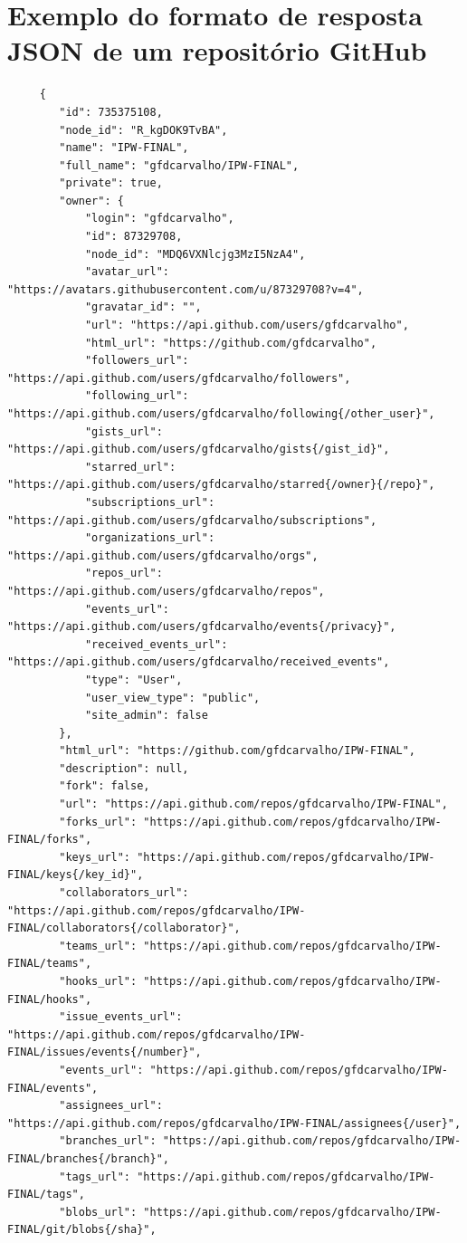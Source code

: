 %
%
\chapter{Exemplo do formato de resposta JSON de um repositório GitHub} \label{ap:repogithub}
\begin{lstlisting}
	 {
		"id": 735375108,
		"node_id": "R_kgDOK9TvBA",
		"name": "IPW-FINAL",
		"full_name": "gfdcarvalho/IPW-FINAL",
		"private": true,
		"owner": {
			"login": "gfdcarvalho",
			"id": 87329708,
			"node_id": "MDQ6VXNlcjg3MzI5NzA4",
			"avatar_url": "https://avatars.githubusercontent.com/u/87329708?v=4",
			"gravatar_id": "",
			"url": "https://api.github.com/users/gfdcarvalho",
			"html_url": "https://github.com/gfdcarvalho",
			"followers_url": "https://api.github.com/users/gfdcarvalho/followers",
			"following_url": "https://api.github.com/users/gfdcarvalho/following{/other_user}",
			"gists_url": "https://api.github.com/users/gfdcarvalho/gists{/gist_id}",
			"starred_url": "https://api.github.com/users/gfdcarvalho/starred{/owner}{/repo}",
			"subscriptions_url": "https://api.github.com/users/gfdcarvalho/subscriptions",
			"organizations_url": "https://api.github.com/users/gfdcarvalho/orgs",
			"repos_url": "https://api.github.com/users/gfdcarvalho/repos",
			"events_url": "https://api.github.com/users/gfdcarvalho/events{/privacy}",
			"received_events_url": "https://api.github.com/users/gfdcarvalho/received_events",
			"type": "User",
			"user_view_type": "public",
			"site_admin": false
		},
		"html_url": "https://github.com/gfdcarvalho/IPW-FINAL",
		"description": null,
		"fork": false,
		"url": "https://api.github.com/repos/gfdcarvalho/IPW-FINAL",
		"forks_url": "https://api.github.com/repos/gfdcarvalho/IPW-FINAL/forks",
		"keys_url": "https://api.github.com/repos/gfdcarvalho/IPW-FINAL/keys{/key_id}",
		"collaborators_url": "https://api.github.com/repos/gfdcarvalho/IPW-FINAL/collaborators{/collaborator}",
		"teams_url": "https://api.github.com/repos/gfdcarvalho/IPW-FINAL/teams",
		"hooks_url": "https://api.github.com/repos/gfdcarvalho/IPW-FINAL/hooks",
		"issue_events_url": "https://api.github.com/repos/gfdcarvalho/IPW-FINAL/issues/events{/number}",
		"events_url": "https://api.github.com/repos/gfdcarvalho/IPW-FINAL/events",
		"assignees_url": "https://api.github.com/repos/gfdcarvalho/IPW-FINAL/assignees{/user}",
		"branches_url": "https://api.github.com/repos/gfdcarvalho/IPW-FINAL/branches{/branch}",
		"tags_url": "https://api.github.com/repos/gfdcarvalho/IPW-FINAL/tags",
		"blobs_url": "https://api.github.com/repos/gfdcarvalho/IPW-FINAL/git/blobs{/sha}",

\end{lstlisting}
